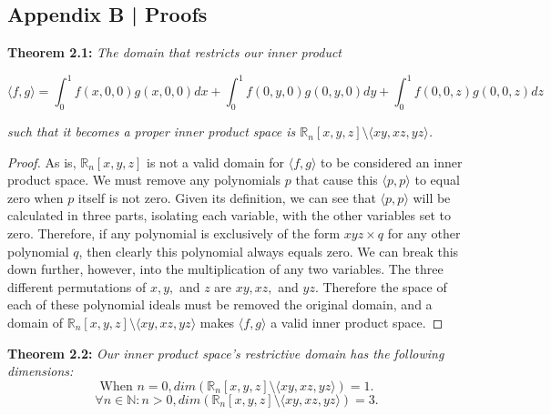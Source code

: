 \documentclass[letterpaper, 12pt]{article}
\begin{document}


\newpage

\begin{centering}\section*{Appendix B | Proofs}\end{centering}
		
\noindent \textbf{Theorem 2.1:} \textit{The domain that restricts our inner product}

\vspace*{-12mm}
$$\langle f, g\rangle = \int_0^1 f(x,0,0)g(x,0,0) dx + \int_0^1 f(0,y,0)g(0,y,0) dy + \int_0^1 f(0,0,z)g(0,0,z) dz$$

\vspace*{-4mm}
\noindent \textit{such that it becomes a proper inner product space is $\mathbb{R}_n [x, y, z] \setminus \langle xy, xz, yz \rangle$.}

\vspace*{4mm}
	\begin{proof}
	As is, $\mathbb{R}_n [x, y, z]$ is not a valid domain for $\langle f, g\rangle$ to be considered an inner product space. We must remove any polynomials $p$ that cause this $\langle p, p\rangle$ to equal zero when $p$ itself is not zero. Given its definition, we can see that $\langle p, p\rangle$ will be calculated in three parts, isolating each variable, with the other variables set to zero. Therefore, if any polynomial is exclusively of the form $xyz \times q$ for any other polynomial $q$, then clearly this polynomial always equals zero. We can break this down further, however, into the multiplication of any two variables. The three different permutations of $x, y,$ and $z$ are $xy, xz,$ and $yz$. Therefore the space of each of these polynomial ideals must be removed the original domain, and a domain of $\mathbb{R}_n [x, y, z] \setminus \langle xy, xz, yz \rangle$ makes $\langle f, g\rangle$ a valid inner product space.
	\end{proof}

\vspace*{2mm}
\noindent \textbf{Theorem 2.2:} \textit{Our inner product space's restrictive domain has the following dimensions:
	\vspace{-8mm}
	$$\text{When }n=0, dim(\mathbb{R}_n [x, y, z] \setminus \langle xy, xz, yz\rangle) = 1.$$
	\vspace{-12mm}
	$$\forall n\in \mathbb{N} : n > 0, dim(\mathbb{R}_n [x, y, z] \setminus \langle xy, xz, yz\rangle) = 3.$$}
\end{document}

